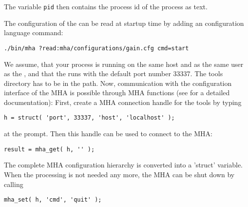 The variable \verb!pid! then contains the process id of the \mhad{} process as text.

The configuration of the \mhad{} can be
read at startup time by adding an \mha{} configuration language command:
%
\begin{verbatim}
./bin/mha ?read:mha/configurations/gain.cfg cmd=start
\end{verbatim}
%
We assume, that your \Matlab{} process is running on the same host and
as the same user as the \mha{}, and that the \mhad{} runs with the
default port number 33337.
%
The \mha{} \Matlab{} tools directory has to be in the \Matlab{} path.
%
Now, communication with the configuration interface of the MHA is
possible through MHA \Matlab{} functions (see 
for a detailed documentation):
%
First, create a MHA connection handle for the \Matlab{} tools by
typing
\begin{verbatim}
h = struct( 'port', 33337, 'host', 'localhost' );
\end{verbatim}
at the \Matlab{} prompt. Then this handle can be used to connect to
the MHA:
%
\begin{verbatim}
result = mha_get( h, '' );
\end{verbatim}
%
The complete MHA configuration hierarchy is converted into a \Matlab{}
'struct' variable.
%
When the \mha{} processing is not needed any more, the MHA can be shut
down by calling
%
\begin{verbatim}
mha_set( h, 'cmd', 'quit' );
\end{verbatim}


